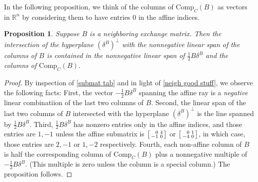 \documentclass{amsart}
\newtheorem{proposition}{Proposition}[section]
\theoremstyle{definition}
\theoremstyle{remark}
\numberwithin{equation}{section}
\newcommand{\reals}{\mathbb R}
\newcommand{\0}{{\mathbf{0}}}
\newcommand{\Comp}{\mathrm{Comp}_C}
\begin{document}
In the following proposition, we think of the columns of $\Comp(B)$ as vectors in $\reals^n$ by considering them to have entries $0$ in the affine indices.

\begin{proposition}\label{Comp span}
Suppose $B$ is a neighboring exchange matrix.
Then the intersection of the hyperplane $(\delta^B)^\perp$ with the nonnegative linear span of the columns of $B$ is contained in the nonnegative linear span of $\frac12B\delta^B$ and the columns of $\Comp(B)$.
\end{proposition}
\begin{proof}
By inspection of \cref{submat tab} and in light of \cref{neigh good stuff}, we observe the following facts:
First, the vector $-\frac12B\delta^B$ spanning the affine ray is a \emph{negative} linear combinatiion of the last two columns of $B$.
Second, the linear span of the last two columns of $B$ intersected with the hyperplane $(\delta^B)^\perp$ is the line spanned by $\frac12B\delta^B$.
Third, $\frac12B\delta^B$ has nonzero entries only in the affine indices, and those entries are $1,-1$ unless the affine submatrix is $\begin{bsmallmatrix*}[r]0&4\\-1&0\end{bsmallmatrix*}$ or $\begin{bsmallmatrix*}[r]0&1\\-4&0\end{bsmallmatrix*}$, in which case, those entries are $2,-1$ or $1,-2$ respectively.
Fourth, each non-affine column of $B$ is half the corresponding column of $\Comp(B)$ plus a nonnegative multiple of $-\frac12B\delta^B$. 
(This multiple is zero unless the column is a special column.)
The proposition follows.
\end{proof}
\end{document}
